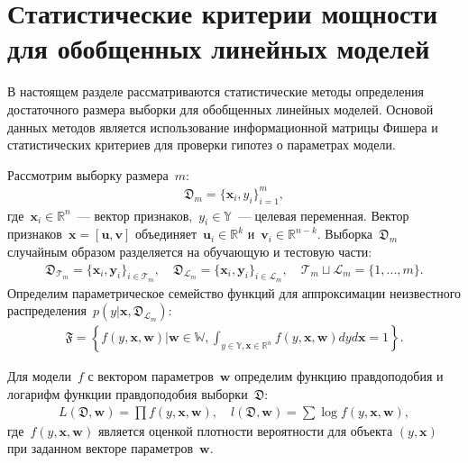 \section{Статистические критерии мощности для обобщенных линейных моделей}

В настоящем разделе рассматриваются статистические методы определения достаточного размера выборки для обобщенных линейных моделей. Основой данных методов является использование информационной матрицы Фишера и статистических критериев для проверки гипотез о параметрах модели.

Рассмотрим выборку размера~$m$:
\[
\label{eq:ps:1}
\begin{aligned}
	\mathfrak{D}_{m} = \{\textbf{x}_i, y_i\}_{i = 1}^{m},
\end{aligned}
\]
где~$\textbf{x}_i\in \mathbb{R}^{n}$~--- вектор признаков,~$y_i\in \mathbb{Y}$~--- целевая переменная. Вектор признаков~$\textbf{x} = [\textbf{u}, \textbf{v}]$ объединяет~$\textbf{u}_i\in \mathbb{R}^{k}$ и~$\textbf{v}_i\in \mathbb{R}^{n-k}$.
Выборка~$\mathfrak{D}_{m}$ случайным образом разделяется на обучающую и тестовую части:
\[
\label{eq:ps:2}
\begin{aligned}
	\mathfrak{D}_{\mathcal{T}_{m}} = \{\textbf{x}_i, \textbf{y}_i\}_{i \in \mathcal{T}_{m}}, \quad \mathfrak{D}_{\mathcal{L}_{m}} = \{\textbf{x}_i, \textbf{y}_i\}_{i \in \mathcal{L}_{m}}, \quad  \mathcal{T}_{m}\sqcup\mathcal{L}_{m} = \{1, ..., m\}.
\end{aligned}
\]
Определим параметрическое семейство функций для аппроксимации неизвестного распределения~$p(y|\textbf{x}, \mathfrak{D}_{\mathcal{L}_{m}})$:
\[
\label{eq:ps:3}
\begin{aligned}
	\mathfrak{F} = \left\{f\left(y,\textbf{x}, \textbf{w}\right)|\textbf{w}\in\mathbb{W}, \int_{y\in \mathbb{Y}, \textbf{x}\in\mathbb{R}^{n}}f\left(y, \textbf{x}, \textbf{w}\right)dyd\textbf{x}=1\right\}.
\end{aligned}
\]

Для модели~$f$ с вектором параметров~$\textbf{w}$ определим функцию правдоподобия и логарифм функции правдоподобия выборки~$\mathfrak{D}$:
\[
\label{eq:ps:4}
\begin{aligned}
	L\left(\mathfrak{D}, \textbf{w}\right) = \prod f\left(y,\textbf{x}, \textbf{w}\right),\quad l\left(\mathfrak{D}, \textbf{w}\right) = \sum \log f\left(y,\textbf{x}, \textbf{w}\right),
\end{aligned}
\]
где~$f(y,\textbf{x}, \textbf{w})$ является оценкой плотности вероятности для объекта $(y, \textbf{x})$ при заданном векторе параметров~$\textbf{w}$.

